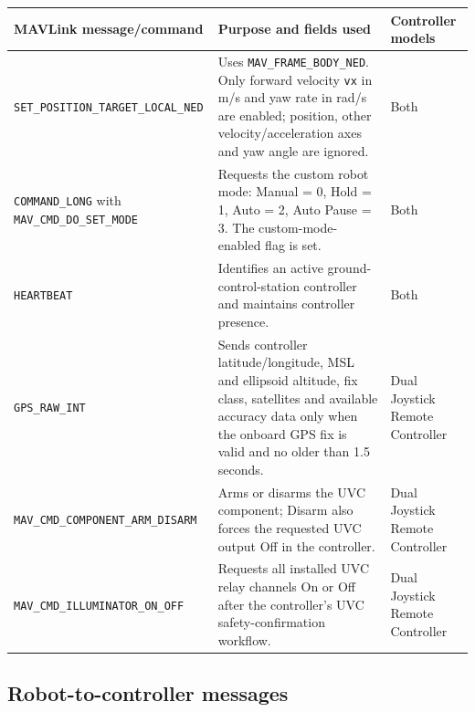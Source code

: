 \documentclass[
  10pt,
  letterpaper,
  openany]{report}
\newcounter{none} %
\begin{document}
{\def\LTcaptype{none} %
\begin{longtable}[]{@{}
  >{\raggedright\arraybackslash}p{}
  >{\raggedright\arraybackslash}p{}
  >{\raggedright\arraybackslash}p{}@{}}
\toprule\noalign{}
\begin{minipage}[b]{\linewidth}\raggedright
MAVLink message/command
\end{minipage} & \begin{minipage}[b]{\linewidth}\raggedright
Purpose and fields used
\end{minipage} & \begin{minipage}[b]{\linewidth}\raggedright
Controller models
\end{minipage} \\
\midrule\noalign{}
\endhead
\bottomrule\noalign{}
\endlastfoot
\texttt{SET\_POSITION\_TARGET\_LOCAL\_NED} & Uses
\texttt{MAV\_FRAME\_BODY\_NED}. Only forward velocity \texttt{vx} in m/s
and yaw rate in rad/s are enabled; position, other velocity/acceleration
axes and yaw angle are ignored. & Both \\
\texttt{COMMAND\_LONG} with \texttt{MAV\_CMD\_DO\_SET\_MODE} & Requests
the custom robot mode: Manual = 0, Hold = 1, Auto = 2, Auto Pause = 3.
The custom-mode-enabled flag is set. & Both \\
\texttt{HEARTBEAT} & Identifies an active ground-control-station
controller and maintains controller presence. & Both \\
\texttt{GPS\_RAW\_INT} & Sends controller latitude/longitude, MSL and
ellipsoid altitude, fix class, satellites and available accuracy data
only when the onboard GPS fix is valid and no older than 1.5 seconds. &
Dual Joystick Remote Controller \\
\texttt{MAV\_CMD\_COMPONENT\_ARM\_DISARM} & Arms or disarms the UVC
component; Disarm also forces the requested UVC output Off in the
controller. & Dual Joystick Remote Controller \\
\texttt{MAV\_CMD\_ILLUMINATOR\_ON\_OFF} & Requests all installed UVC
relay channels On or Off after the controller's UVC safety-confirmation
workflow. & Dual Joystick Remote Controller \\
\end{longtable}
}

\subsection{Robot-to-controller
messages}\label{robot-to-controller-messages}
\end{document}
